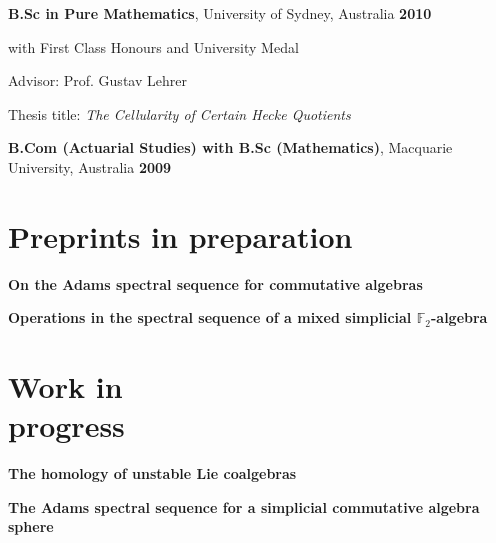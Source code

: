 \documentclass[margin,line]{resume}
\begin{document}
\begin{resume}
    \vspace{-2.5mm}
    \textbf{B.Sc in Pure Mathematics}, University of Sydney, Australia \vspace{1mm} \hfill \textbf{2010}\\%

\vspace{-3mm}
    \begin{list2}
        \item with First Class Honours and University Medal
        \item Advisor: Prof. Gustav Lehrer
        \item Thesis title: \emph{The Cellularity of Certain Hecke Quotients}
    \end{list2}

    
    \vspace{-2.5mm}
    \textbf{B.Com (Actuarial Studies) with B.Sc (Mathematics)}, Macquarie University, Australia \vspace{1mm} \hfill \textbf{2009}\\%

        \section{\mysidestyle Preprints in preparation}
        
\noindent \textbf{On the Adams spectral sequence for commutative algebras} 

\vspace{-1.5mm}

\noindent \textbf{Operations in the spectral sequence of a mixed simplicial $\mathbb{F}_2$-algebra} 

\vspace{1mm}

        \section{\mysidestyle Work in \\progress}

\noindent \textbf{The homology of unstable Lie coalgebras} 

\vspace{-1.5mm}

\noindent \textbf{The Adams spectral sequence for a simplicial commutative algebra
sphere} 


\end{resume}
\end{document}
